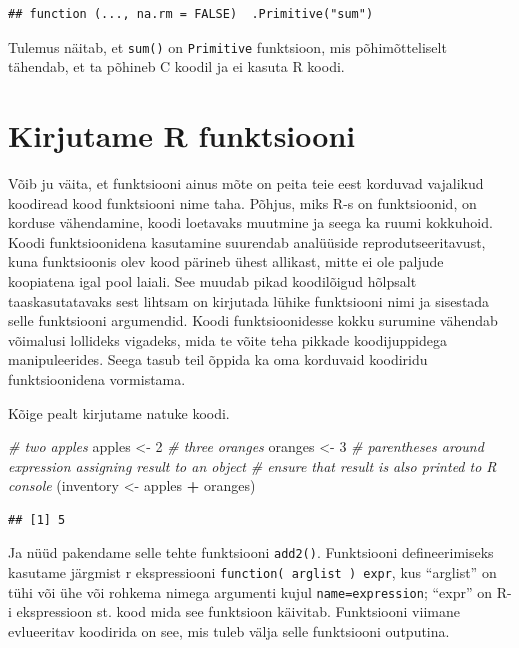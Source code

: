 \documentclass[]{book}
\newenvironment{Shaded}{\begin{snugshade}}{\end{snugshade}}
\newcommand{\DecValTok}[1]{\textcolor[rgb]{0.00,0.00,0.81}{#1}}
\newcommand{\StringTok}[1]{\textcolor[rgb]{0.31,0.60,0.02}{#1}}
\newcommand{\CommentTok}[1]{\textcolor[rgb]{0.56,0.35,0.01}{\textit{#1}}}
\newcommand{\OperatorTok}[1]{\textcolor[rgb]{0.81,0.36,0.00}{\textbf{#1}}}
\newcommand{\NormalTok}[1]{#1}
\begin{document}
\begin{verbatim}
## function (..., na.rm = FALSE)  .Primitive("sum")
\end{verbatim}

Tulemus näitab, et \texttt{sum()} on \texttt{Primitive} funktsioon, mis
põhimõtteliselt tähendab, et ta põhineb C koodil ja ei kasuta R koodi.

\section{Kirjutame R funktsiooni}\label{kirjutame-r-funktsiooni}

Võib ju väita, et funktsiooni ainus mõte on peita teie eest korduvad
vajalikud koodiread kood funktsiooni nime taha. Põhjus, miks R-s on
funktsioonid, on korduse vähendamine, koodi loetavaks muutmine ja seega
ka ruumi kokkuhoid. Koodi funktsioonidena kasutamine suurendab
analüüside reprodutseeritavust, kuna funktsioonis olev kood pärineb
ühest allikast, mitte ei ole paljude koopiatena igal pool laiali. See
muudab pikad koodilõigud hõlpsalt taaskasutatavaks sest lihtsam on
kirjutada lühike funktsiooni nimi ja sisestada selle funktsiooni
argumendid. Koodi funktsioonidesse kokku surumine vähendab võimalusi
lollideks vigadeks, mida te võite teha pikkade koodijuppidega
manipuleerides. Seega tasub teil õppida ka oma korduvaid koodiridu
funktsioonidena vormistama.

Kõige pealt kirjutame natuke koodi.

\begin{Shaded}
\begin{Highlighting}[]
\CommentTok{# two apples}
\NormalTok{apples <-}\StringTok{ }\DecValTok{2}
\CommentTok{# three oranges}
\NormalTok{oranges <-}\StringTok{ }\DecValTok{3} 
\CommentTok{# parentheses around expression assigning result to an object }
\CommentTok{# ensure that result is also printed to R console}
\NormalTok{(inventory <-}\StringTok{ }\NormalTok{apples }\OperatorTok{+}\StringTok{ }\NormalTok{oranges)}
\end{Highlighting}
\end{Shaded}

\begin{verbatim}
## [1] 5
\end{verbatim}

Ja nüüd pakendame selle tehte funktsiooni \texttt{add2()}. Funktsiooni
defineerimiseks kasutame järgmist r ekspressiooni
\texttt{function(\ arglist\ )\ expr}, kus ``arglist'' on tühi või ühe
või rohkema nimega argumenti kujul \texttt{name=expression}; ``expr'' on
R-i ekspressioon st. kood mida see funktsioon käivitab. Funktsiooni
viimane evlueeritav koodirida on see, mis tuleb välja selle funktsiooni
outputina.
\end{document}
